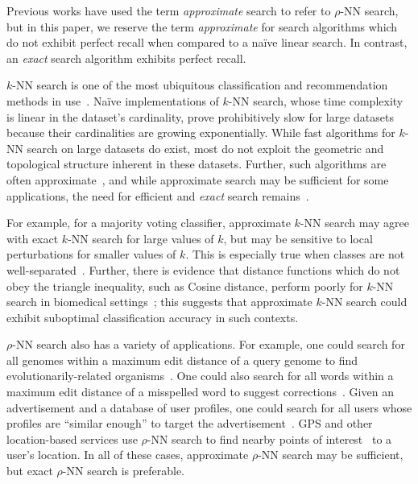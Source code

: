 Previous works have used the term \textit{approximate} search to refer to $\rho$-NN search, but in this paper, we reserve the term \textit{approximate} for search algorithms which do not exhibit perfect recall when compared to a na\"{i}ve linear search.
In contrast, an \textit{exact} search algorithm exhibits perfect recall.

$k$-NN search is one of the most ubiquitous classification and recommendation methods in use~\cite{fix1952discriminatory, cover1967nearest}.
Na\"{i}ve implementations of $k$-NN search, whose time complexity is linear in the dataset's cardinality, prove prohibitively slow for large datasets because their cardinalities are growing exponentially.
While fast algorithms for $k$-NN search on large datasets do exist, most do not exploit the geometric and topological structure inherent in these datasets.
Further, such algorithms are often approximate~\cite{taunk2019brief}, and while approximate search may be sufficient for some applications, the need for efficient and \textit{exact} search remains~\cite{ukey2023survey}.

For example, for a majority voting classifier, approximate $k$-NN search may agree with exact $k$-NN search for large values of $k$, but may be sensitive to local perturbations for smaller values of $k$.
This is especially true when classes are not well-separated~\cite{zhang2022imbalanced}.
Further, there is evidence that distance functions which do not obey the triangle inequality, such as Cosine distance, perform poorly for $k$-NN search in biomedical settings~\cite{hu2016distance};
this suggests that approximate $k$-NN search could exhibit suboptimal classification accuracy in such contexts.

$\rho$-NN search also has a variety of applications.
For example, one could search for all genomes within a maximum edit distance of a query genome to find evolutionarily-related organisms~\cite{budowski2010fragbag}.
One could also search for all words within a maximum edit distance of a misspelled word to suggest corrections~\cite{ukkonen1985algorithms}.
Given an advertisement and a database of user profiles, one could search for all users whose profiles are ``similar enough'' to target the advertisement~\cite{zhang2020privacy}.
GPS and other location-based services use $\rho$-NN search to find nearby points of interest~\cite{zhang2020privacy} to a user's location.
In all of these cases, approximate $\rho$-NN search may be sufficient, but exact $\rho$-NN search is preferable.

